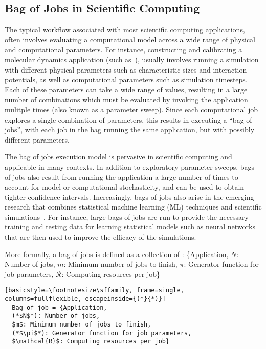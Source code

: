 \subsection{Bag of Jobs in Scientific Computing}

The typical workflow associated with most scientific computing applications, often involves evaluating a computational model across a wide range of physical and computational parameters. 
For instance, constructing and calibrating a molecular dynamics application (such as~\cite{jcs1}), usually involves running a simulation with different physical parameters such as characteristic sizes and interaction potentials, as well as computational parameters such as simulation timesteps. 
Each of these parameters can take a wide range of values, resulting in a large number of combinations which must be evaluated by invoking the application mulitple times (also known as a parameter sweep). 
Since each computational job explores a single combination of parameters, this results in executing a ``bag of jobs'', with each job in the bag running the same application, but with possibly different parameters. 


The bag of jobs execution model is pervasive in scientific computing and applicable in many contexts.
In addition to exploratory parameter sweeps, bags of jobs also result from running the application a large number of times to account for model or computational stochasticity, and can be used to obtain tighter confidence intervals. 
Increasingly, bags of jobs also arise in the emerging research that combines statistical machine learning (ML) techniques and scientific simulations~\cite{ml.atomic2017,melko2017,sam2017,fu2017,long2015machine, ferguson2017machine,ward2018matminer,jcs1,jcs2,fox2019learning}.
For instance, large bags of jobs are run to provide the necessary training and testing data for learning statistical models such as neural networks that are then used to improve the efficacy of the simulations. 


More formally, a bag of jobs is defined as a collection of : \{Application, $N$: Number of jobs, $m$: Minimum number of jobs to finish, $\pi$: Generator function for job parameters, $\mathcal{R}$: Computing resources per job\}

\begin{lstlisting}[basicstyle=\footnotesize\sffamily, frame=single, columns=fullflexible, escapeinside={(*}{*)}]
  Bag of job = {Application,
  (*$N$*): Number of jobs,
  $m$: Minimum number of jobs to finish,
  (*$\pi$*): Generator function for job parameters,
  $\mathcal{R}$: Computing resources per job}
\end{lstlisting}

